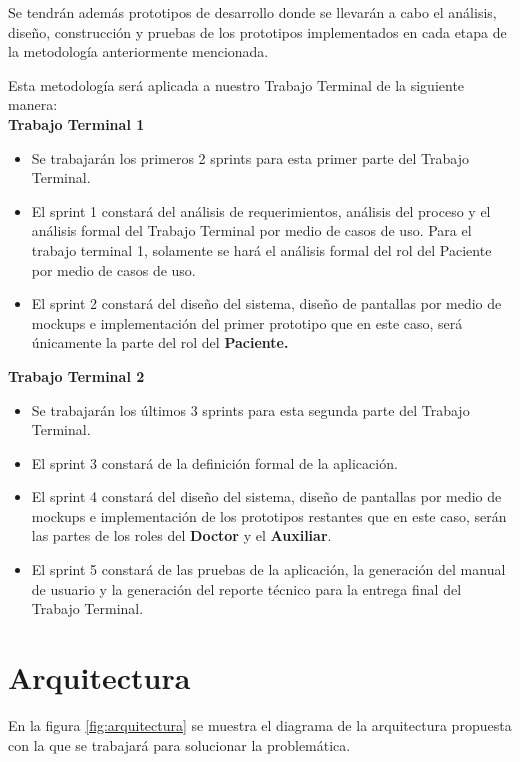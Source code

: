 Se tendrán además prototipos de desarrollo donde se llevarán a cabo el análisis, diseño, construcción y pruebas de los prototipos implementados en cada etapa de la metodología anteriormente mencionada.

Esta metodología será aplicada a nuestro Trabajo Terminal de la siguiente manera:\\

\textbf{Trabajo Terminal 1}
\begin{itemize}
	\item Se trabajarán los primeros 2 sprints para esta primer parte del Trabajo Terminal.
	\item El sprint 1 constará del análisis de requerimientos, análisis del proceso y el análisis formal del Trabajo Terminal por medio de casos de uso. Para el trabajo terminal 1, solamente se hará el análisis formal del rol del Paciente por medio de casos de uso.
	\item El sprint 2 constará del diseño del sistema, diseño de pantallas por medio de mockups e implementación del primer prototipo que en este caso, será únicamente la parte del rol del \textbf{Paciente.}
\end{itemize}

\textbf{Trabajo Terminal 2}
\begin{itemize}
	\item Se trabajarán los últimos 3 sprints para esta segunda parte del Trabajo Terminal.
	\item El sprint 3 constará de la definición formal de la aplicación.
	\item El sprint 4 constará del diseño del sistema, diseño de pantallas por medio de mockups e implementación de los prototipos restantes que en este caso, serán las partes de los roles del \textbf{Doctor} y el \textbf{Auxiliar}.
	\item El sprint 5 constará de las pruebas de la aplicación, la generación del manual de usuario y la generación del reporte técnico para la entrega final del Trabajo Terminal.
\end{itemize}


\section{Arquitectura}

En la figura \ref{fig:arquitectura} se muestra el diagrama de la arquitectura propuesta con la que se trabajará para solucionar la problemática.


